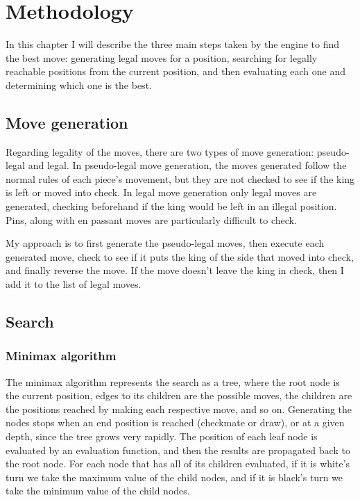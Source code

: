\chapter{Methodology}
\label{chap:ch3}

In this chapter I will describe the three main steps taken by the engine to find the best move: generating legal moves for a position, searching for legally reachable positions from the current position, and then evaluating each one and determining which one is the best.\cite{marsland1986review}


\section{Move generation}
\label{sec:ch3sec1}

Regarding legality of the moves, there are two types of move generation: pseudo-legal and legal. In pseudo-legal move generation, the moves generated follow the normal rules of each piece's movement, but they are not checked to see if the king is left or moved into check. In legal move generation only legal moves are generated, checking beforehand if the king would be left in an illegal position. Pins, along with en passant moves are particularly difficult to check.

My approach is to first generate the pseudo-legal moves, then execute each generated move, check to see if it puts the king of the side that moved into check, and finally reverse the move. If the move doesn't leave the king in check, then I add it to the list of legal moves.

\section{Search}
\label{sec:ch3sec2}


\subsection{Minimax algorithm}
\label{subsec:ch3sec2subsec1}

The minimax algorithm represents the search as a tree, where the root node is the current position, edges to its children are the possible moves, the children are the positions reached by making each respective move, and so on. Generating the nodes stops when an end position is reached (checkmate or draw), or at a given depth, since the tree grows very rapidly. The position of each leaf node is evaluated by an evaluation function, and then the results are propagated back to the root node. For each node that has all of its children evaluated, if it is white's turn we take the maximum value of the child nodes, and if it is black's turn we take the minimum value of the child nodes.\cite{klein2022neural}


